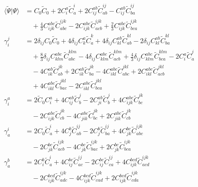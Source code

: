 \begin{align}
\langle\widetilde\Psi\vert\Psi\rangle &= C_{0} \widetilde{C}_{0} + 2 C^{a}_{i} \widetilde{C}^{i}_{a} + 2 C^{ab}_{ij} \widetilde{C}^{ij}_{ab} - C^{ab}_{ij} \widetilde{C}^{ij}_{ba} \\
&\quad {}+ \frac{4}{3} C^{abc}_{ijk} \widetilde{C}^{ijk}_{abc} - 2 C^{abc}_{ijk} \widetilde{C}^{ijk}_{acb} + \frac{2}{3} C^{abc}_{ijk} \widetilde{C}^{ijk}_{bca} \\
\gamma^{j}_{i} &= 2 \delta_{ij} C_{0} \widetilde{C}_{0} + 4 \delta_{ij} C^{a}_{k} \widetilde{C}^{k}_{a} + 4 \delta_{ij} C^{ab}_{kl} \widetilde{C}^{kl}_{ab} - 2 \delta_{ij} C^{ab}_{kl} \widetilde{C}^{kl}_{ba} \\
&\quad {}+ \frac{8}{3} \delta_{ij} C^{abc}_{klm} \widetilde{C}^{klm}_{abc} - 4 \delta_{ij} C^{abc}_{klm} \widetilde{C}^{klm}_{acb} + \frac{4}{3} \delta_{ij} C^{abc}_{klm} \widetilde{C}^{klm}_{bca} - 2 C^{a}_{i} \widetilde{C}^{j}_{a} \\
&\quad -4 C^{ab}_{ik} \widetilde{C}^{jk}_{ab} + 2 C^{ab}_{ik} \widetilde{C}^{jk}_{ba} - 4 C^{abc}_{ikl} \widetilde{C}^{jkl}_{abc} + 2 C^{abc}_{ikl} \widetilde{C}^{jkl}_{acb} \\
&\quad {}+ 4 C^{abc}_{ikl} \widetilde{C}^{jkl}_{bac} - 2 C^{abc}_{ikl} \widetilde{C}^{jkl}_{bca} \\
\gamma^{a}_{i} &= 2 \widetilde{C}_{0} C^{a}_{i} + 4 C^{ab}_{ij} \widetilde{C}^{j}_{b} - 2 C^{ab}_{ji} \widetilde{C}^{j}_{b} + 4 C^{abc}_{ijk} \widetilde{C}^{jk}_{bc} \\
&\quad -2 C^{abc}_{ijk} \widetilde{C}^{jk}_{cb} - 4 C^{abc}_{jik} \widetilde{C}^{jk}_{bc} + 2 C^{abc}_{jik} \widetilde{C}^{jk}_{cb} \\
\gamma^{i}_{a} &= 2 C_{0} \widetilde{C}^{i}_{a} + 4 C^{b}_{j} \widetilde{C}^{ij}_{ab} - 2 C^{b}_{j} \widetilde{C}^{ij}_{ba} + 4 C^{bc}_{jk} \widetilde{C}^{ijk}_{abc} \\
&\quad -2 C^{bc}_{jk} \widetilde{C}^{ijk}_{acb} - 4 C^{bc}_{jk} \widetilde{C}^{ijk}_{bac} + 2 C^{bc}_{jk} \widetilde{C}^{ijk}_{bca} \\
\gamma^{b}_{a} &= 2 C^{b}_{i} \widetilde{C}^{i}_{a} + 4 C^{bc}_{ij} \widetilde{C}^{ij}_{ac} - 2 C^{bc}_{ij} \widetilde{C}^{ij}_{ca} + 4 C^{bcd}_{ijk} \widetilde{C}^{ijk}_{acd} \\
&\quad -2 C^{bcd}_{ijk} \widetilde{C}^{ijk}_{adc} - 4 C^{bcd}_{ijk} \widetilde{C}^{ijk}_{cad} + 2 C^{bcd}_{ijk} \widetilde{C}^{ijk}_{cda}
\end{align}
